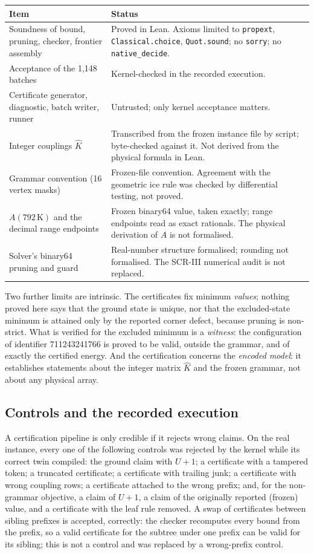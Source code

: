 \documentclass[11pt,a4paper]{article}
\theoremstyle{plain}
\theoremstyle{definition}
\theoremstyle{remark}
\newcommand{\lean}[1]{\nolinkurl{#1}}
\begin{document}
\begin{center}\small
\begin{tabularx}{\linewidth}{@{}p{3.1cm}X@{}}
\toprule
Item & Status\\
\midrule
Soundness of bound, pruning, checker, frontier assembly & Proved in Lean. Axioms limited to \lean{propext}, \lean{Classical.choice}, \lean{Quot.sound}; no \lean{sorry}; no \lean{native_decide}.\\
Acceptance of the 1{,}148 batches & Kernel-checked in the recorded execution.\\
Certificate generator, diagnostic, batch writer, runner & Untrusted; only kernel acceptance matters.\\
Integer couplings $\hat K$ & Transcribed from the frozen instance file by script; byte-checked against it. Not derived from the physical formula in Lean.\\
Grammar convention (16 vertex masks) & Frozen-file convention. Agreement with the geometric ice rule was checked by differential testing, not proved.\\
$A(792\,\mathrm K)$ and the decimal range endpoints & Frozen binary64 value, taken exactly; range endpoints read as exact rationals. The physical derivation of $A$ is not formalised.\\
Solver's binary64 pruning and guard & Real-number structure formalised; rounding not formalised. The SCR-III numerical audit is not replaced.\\
\bottomrule
\end{tabularx}
\end{center}
Two further limits are intrinsic. The certificates fix minimum \emph{values}; nothing proved here says that the ground state is unique, nor that the excluded-state minimum is attained only by the reported corner defect, because pruning is non-strict. What is verified for the excluded minimum is a \emph{witness}: the configuration of identifier 711243241766 is proved to be valid, outside the grammar, and of exactly the certified energy. And the certification concerns the \emph{encoded model}: it establishes statements about the integer matrix $\hat K$ and the frozen grammar, not about any physical array.

\subsection{Controls and the recorded execution}
A certification pipeline is only credible if it rejects wrong claims. On the real instance, every one of the following controls was rejected by the kernel while its correct twin compiled: the ground claim with $U+1$; a certificate with a tampered token; a truncated certificate; a certificate with trailing junk; a certificate with wrong coupling rows; a certificate attached to the wrong prefix; and, for the non-grammar objective, a claim of $U+1$, a claim of the originally reported (frozen) value, and a certificate with the leaf rule removed. A swap of certificates between sibling prefixes is accepted, correctly: the checker recomputes every bound from the prefix, so a valid certificate for the subtree under one prefix can be valid for its sibling; this is not a control and was replaced by a wrong-prefix control.
\end{document}
